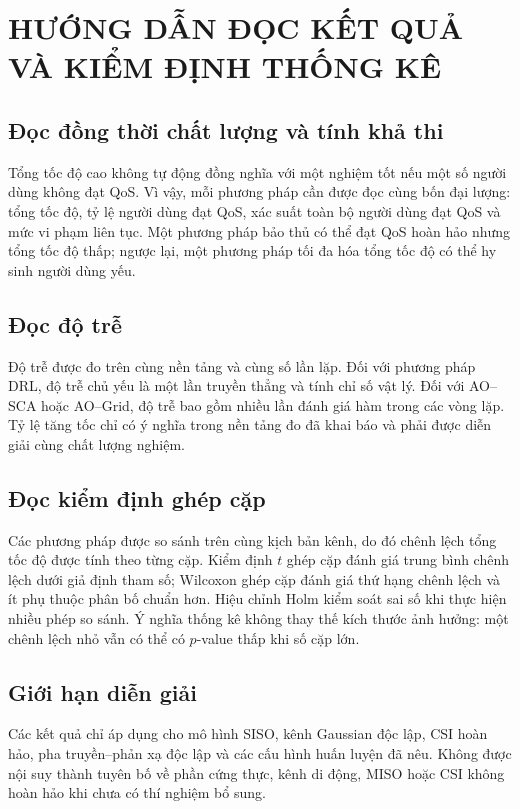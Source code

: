 \chapter{HƯỚNG DẪN ĐỌC KẾT QUẢ VÀ KIỂM ĐỊNH THỐNG KÊ}
\label{app:statistics-guide}

\section{Đọc đồng thời chất lượng và tính khả thi}
Tổng tốc độ cao không tự động đồng nghĩa với một nghiệm tốt nếu một số người dùng không đạt QoS. Vì vậy, mỗi phương pháp cần được đọc cùng bốn đại lượng: tổng tốc độ, tỷ lệ người dùng đạt QoS, xác suất toàn bộ người dùng đạt QoS và mức vi phạm liên tục. Một phương pháp bảo thủ có thể đạt QoS hoàn hảo nhưng tổng tốc độ thấp; ngược lại, một phương pháp tối đa hóa tổng tốc độ có thể hy sinh người dùng yếu.

\section{Đọc độ trễ}
Độ trễ được đo trên cùng nền tảng và cùng số lần lặp. Đối với phương pháp DRL, độ trễ chủ yếu là một lần truyền thẳng và tính chỉ số vật lý. Đối với AO--SCA hoặc AO--Grid, độ trễ bao gồm nhiều lần đánh giá hàm trong các vòng lặp. Tỷ lệ tăng tốc chỉ có ý nghĩa trong nền tảng đo đã khai báo và phải được diễn giải cùng chất lượng nghiệm.

\section{Đọc kiểm định ghép cặp}
Các phương pháp được so sánh trên cùng kịch bản kênh, do đó chênh lệch tổng tốc độ được tính theo từng cặp. Kiểm định $t$ ghép cặp đánh giá trung bình chênh lệch dưới giả định tham số; Wilcoxon ghép cặp đánh giá thứ hạng chênh lệch và ít phụ thuộc phân bố chuẩn hơn. Hiệu chỉnh Holm kiểm soát sai số khi thực hiện nhiều phép so sánh. Ý nghĩa thống kê không thay thế kích thước ảnh hưởng: một chênh lệch nhỏ vẫn có thể có $p$-value thấp khi số cặp lớn.

\section{Giới hạn diễn giải}
Các kết quả chỉ áp dụng cho mô hình SISO, kênh Gaussian độc lập, CSI hoàn hảo, pha truyền--phản xạ độc lập và các cấu hình huấn luyện đã nêu. Không được nội suy thành tuyên bố về phần cứng thực, kênh di động, MISO hoặc CSI không hoàn hảo khi chưa có thí nghiệm bổ sung.
